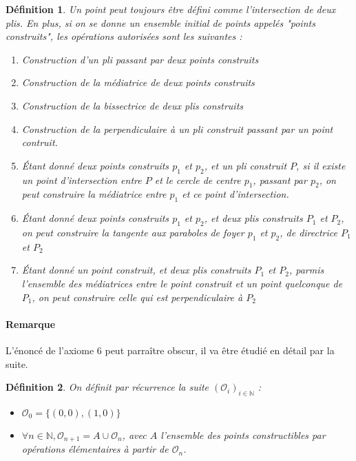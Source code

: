 \documentclass[a4paper,12pt,french]{report}
\newtheorem{definition}{Définition}[section]
\begin{document}
			\begin{definition}
			Un point peut toujours être défini comme l'intersection de deux plis. En plus, si on se donne un ensemble initial de points appelés "points construits", les opérations autorisées sont les suivantes : 
				\begin{enumerate}
					\item Construction d'un pli passant par deux points construits
					\item Construction de la médiatrice de deux points construits
					\item Construction de la bissectrice de deux plis construits
					\item Construction de la perpendiculaire à un pli construit passant par un point contruit.
					\item Étant donné deux points construits $p_{1}$ et $p_{2}$, et un pli construit $P$, si il existe un point d'intersection entre $P$ et le cercle de centre $p_{1}$, passant par $p_{2}$, on peut construire la médiatrice entre $p_{1}$ et ce point d'intersection.
					\item Étant donné deux points construits $p_{1}$ et $p_{2}$, et deux plis construits $P_{1}$ et $P_{2}$, on peut construire la tangente aux paraboles de foyer $p_{1}$ et $p_{2}$, de directrice $P_{1}$ et $P_{2}$
					\item Étant donné un point construit, et deux plis construits $P_{1}$ et $P_{2}$, parmis l'ensemble des médiatrices entre le point construit et un point quelconque de $P_{1}$, on peut construire celle qui est perpendiculaire à $P_{2}$
				\end{enumerate}
			\end{definition}
			
			\paragraph{Remarque}
			L'énoncé de l'axiome 6 peut parraître obscur, il va être étudié en détail par la suite.

			\begin{definition}
				On définit par récurrence la suite \((\mathcal{O}_i)_{i \in \mathbb{N}} \) :
				\begin{itemize}
					\item \(\mathcal{O}_0 = \{(0, 0), (1, 0)\}\)
					\item \(\forall n \in \mathbb{N}, \mathcal{O}_{n+1} = A\cup \mathcal{O}_{n}\), avec \(A\) l'ensemble des points constructibles par opérations élémentaires à partir de \( \mathcal{O}_{n} \).
				\end{itemize}
			\end{definition}
\end{document}
